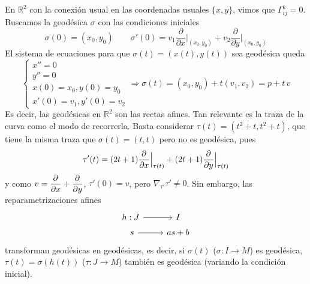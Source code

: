 \begin{ejem}
    En $\mathbb R^2$ con la conexión usual en las coordenadas usuales $\{x,y\}$, vimos que $\Gamma_{ij}^k = 0$. Buscamos la geodésica $\sigma$ con las condiciones iniciales $$\sigma(0) = (x_0,y_0) \qquad \sigma'(0) = v_1 \dfrac{\partial}{\partial x}\Big|_{(x_0,y_0)} + v_2 \dfrac{\partial}{\partial y}\Big|_{(x_0,y_0)}$$
    El sistema de ecuaciones para que $\sigma(t) = (x(t),y(t))$ sea geodésica queda $$\begin{cases}
        x'' = 0\\
        y'' = 0\\
        x(0) = x_0, y(0) = y_0\\
        x'(0) = v_1, y'(0) = v_2
    \end{cases} \Rightarrow \sigma(t) = (x_0,y_0) + t(v_1,v_2) = p + t\,v$$
    Es decir, las geodésicas en $\mathbb R^2$ son las rectas afines. Tan relevante es la traza de la curva como el modo de recorrerla. Basta considerar $\tau(t) =(t^2+t,t^2+t)$, que tiene la misma traza que $\sigma(t)=(t,t)$ pero no es geodésica, pues $$\tau'(t)=(2t+1)\dfrac{\partial^{} }{\partial x}\Big|_{\tau(t)} + (2t+1)\dfrac{\partial^{} }{\partial y}\Big|_{\tau(t)}$$
    y como $v=\dfrac{\partial^{} }{\partial x} + \dfrac{\partial^{} }{\partial y}$, $\tau'(0) = v$, pero $\nabla_{\tau'}\tau'\neq 0$. Sin embargo, las reparametrizaciones afines $$\begin{tikzcd}
        h:J \rar & I\\[-5mm]
        \, \, s \rar & as + b
    \end{tikzcd}$$
    transforman geodésicas en geodésicas, es decir, si $\sigma(t)$ ($\sigma: I \to M$) es geod\'esica, $\tau(t) = \sigma(h(t))$ ($\tau: J \to M$) tambi\'en es geod\'esica (variando la condición inicial).
\end{ejem}

